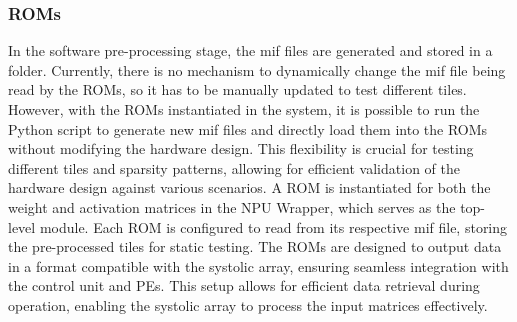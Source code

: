 \documentclass[12pt, a4paper, ukenglish]{article}
\begin{document}
    \subsubsection{ROMs}    \label{sec: roms}
    
    In the software pre-processing stage, the mif files are generated and stored in a folder. Currently, there is no mechanism to dynamically change the mif file being read by the ROMs, so it has to be manually updated to test different tiles. However, with the ROMs instantiated in the system, it is possible to run the Python script to generate new mif files and directly load them into the ROMs without modifying the hardware design. This flexibility is crucial for testing different tiles and sparsity patterns, allowing for efficient validation of the hardware design against various scenarios.
    A ROM is instantiated for both the weight and activation matrices in the NPU Wrapper, which serves as the top-level module. Each ROM is configured to read from its respective mif file, storing the pre-processed tiles for static testing. The ROMs are designed to output data in a format compatible with the systolic array, ensuring seamless integration with the control unit and PEs. This setup allows for efficient data retrieval during operation, enabling the systolic array to process the input matrices effectively.
\end{document}
